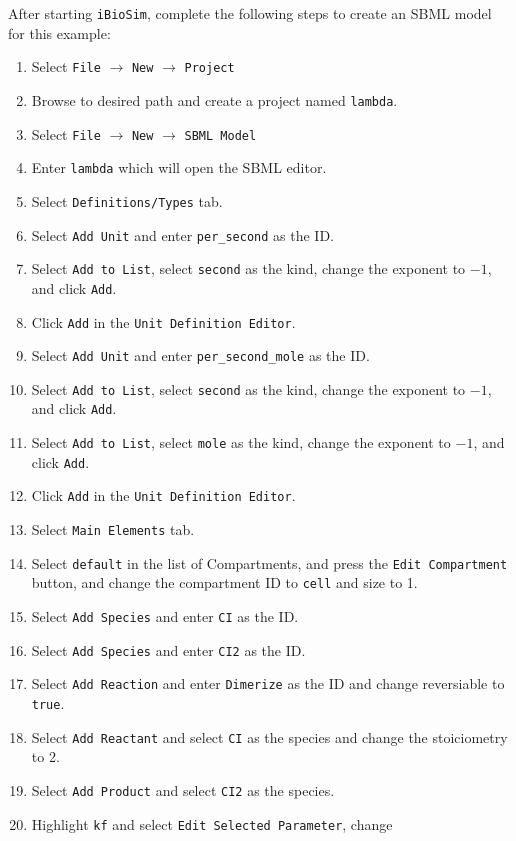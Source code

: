 \documentclass[titlepage,11pt]{article}
\begin{document}
\noindent
After starting {\tt iBioSim}, complete the following steps to create
an SBML model for this example:
\begin{enumerate}
\item Select {\tt File} $\rightarrow$ {\tt New} $\rightarrow$ {\tt Project}
\item Browse to desired path and create a project named {\tt lambda}.
\item Select {\tt File} $\rightarrow$ {\tt New} $\rightarrow$ {\tt SBML Model}
\item Enter {\tt lambda} which will open the SBML editor.
\item Select {\tt Definitions/Types} tab.
\item Select {\tt Add Unit} and enter {\tt per\_second} as the ID.
\item Select {\tt Add to List}, select {\tt second} as the kind, change
      the exponent to $-1$, and click {\tt Add}.
\item Click {\tt Add} in the {\tt Unit Definition Editor}.
\item Select {\tt Add Unit} and enter {\tt per\_second\_mole} as the ID.
\item Select {\tt Add to List}, select {\tt second} as the kind, change
      the exponent to $-1$, and click {\tt Add}.
\item Select {\tt Add to List}, select {\tt mole} as the kind, change
      the exponent to $-1$, and click {\tt Add}.
\item Click {\tt Add} in the {\tt Unit Definition Editor}.
\item Select {\tt Main Elements} tab.
\item Select {\tt default} in the list of Compartments, and press the
      {\tt Edit Compartment} button, and change the compartment ID to 
      {\tt cell} and size to 1.
\item Select {\tt Add Species} and enter {\tt CI} as the ID.
\item Select {\tt Add Species} and enter {\tt CI2} as the ID.
\item Select {\tt Add Reaction} and enter {\tt Dimerize} as the ID and
      change reversiable to {\tt true}.
\item Select {\tt Add Reactant} and select {\tt CI} as the species and change
      the stoiciometry to 2.
\item Select {\tt Add Product} and select {\tt CI2} as the species.
\item Highlight {\tt kf} and select {\tt Edit Selected Parameter}, change

\end{enumerate}
\end{document}
